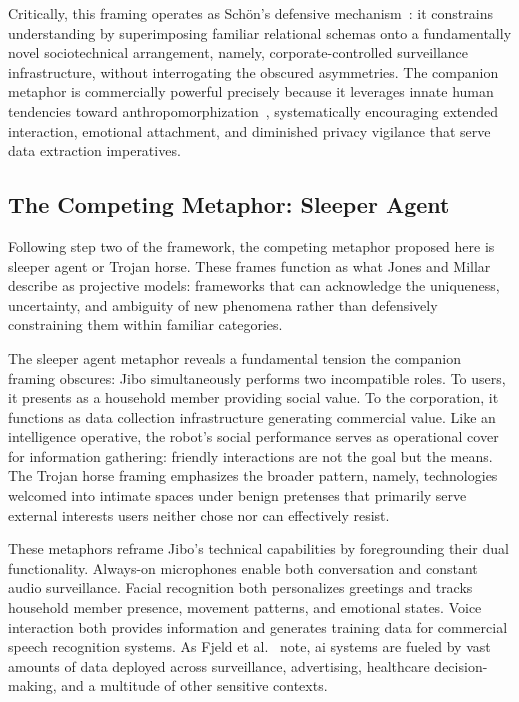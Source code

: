 \documentclass[11pt,showkeys]{../../shared/essay}
\begin{document}
Critically, this framing operates as Sch\"{o}n's defensive mechanism~\cite{schon_generative_1993}: it constrains understanding by superimposing familiar relational schemas onto a fundamentally novel sociotechnical arrangement, namely, corporate-controlled surveillance infrastructure, without interrogating the obscured asymmetries. The companion metaphor is commercially powerful precisely because it leverages innate human tendencies toward anthropomorphization~\cite{darling_whos_2015}, systematically encouraging extended interaction, emotional attachment, and diminished privacy vigilance that serve data extraction imperatives.

\subsection{The Competing Metaphor: Sleeper Agent}

Following step two of the framework, the competing metaphor proposed here is sleeper agent or Trojan horse. These frames function as what Jones and Millar~\cite{jones_hacking_2017} describe as projective models: frameworks that can acknowledge the uniqueness, uncertainty, and ambiguity of new phenomena rather than defensively constraining them within familiar categories.

The sleeper agent metaphor reveals a fundamental tension the companion framing obscures: Jibo simultaneously performs two incompatible roles. To users, it presents as a household member providing social value. To the corporation, it functions as data collection infrastructure generating commercial value. Like an intelligence operative, the robot's social performance serves as operational cover for information gathering: friendly interactions are not the goal but the means. The Trojan horse framing emphasizes the broader pattern, namely, technologies welcomed into intimate spaces under benign pretenses that primarily serve external interests users neither chose nor can effectively resist.

These metaphors reframe Jibo's technical capabilities by foregrounding their dual functionality. Always-on microphones enable both conversation and constant audio surveillance. Facial recognition both personalizes greetings and tracks household member presence, movement patterns, and emotional states. Voice interaction both provides information and generates training data for commercial speech recognition systems. As Fjeld et al.~\cite{fjeld_principled_2020} note, \gls{ai} systems are fueled by vast amounts of data deployed across surveillance, advertising, healthcare decision-making, and a multitude of other sensitive contexts.
\end{document}
